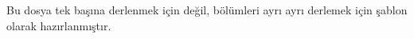\documentclass[openany]{memoir}
\begin{document}
Bu dosya tek başına derlenmek için değil, bölümleri ayrı ayrı derlemek için şablon olarak hazırlanmıştır.
\end{document}

